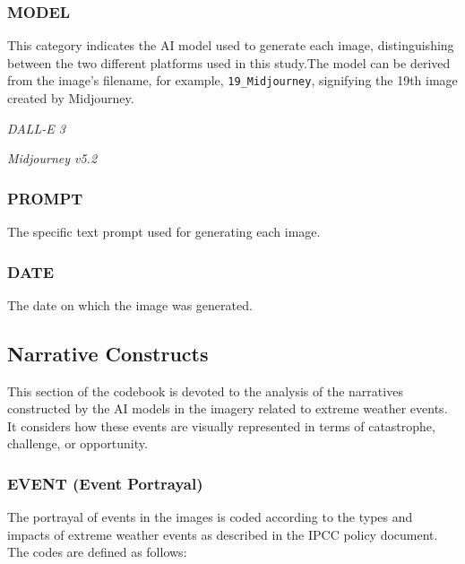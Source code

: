  \subsubsection*{MODEL} 

 This category indicates the AI model used to generate each image, distinguishing between the two different platforms used in this study.The model can be derived from the image's filename, for example, \texttt{19\_Midjourney}, signifying the 19th image created by Midjourney.

\begin{description}[leftmargin=2.5cm, style=multiline, labelwidth=1.5cm]
\item[1] \textit{DALL-E 3}
\item[2] \textit{Midjourney v5.2}
\end{description}

\subsubsection*{PROMPT}

 The specific text prompt used for generating each image.

 \subsubsection*{DATE} 

The date on which the image was generated.
\subsection{Narrative Constructs}

This section of the codebook is devoted to the analysis of the narratives constructed by the AI models in the imagery related to extreme weather events. It considers how these events are visually represented in terms of catastrophe, challenge, or opportunity.

\subsubsection*{EVENT (Event Portrayal)}
The portrayal of events in the images is coded according to the types and impacts of extreme weather events as described in the IPCC policy document. The codes are defined as follows:

